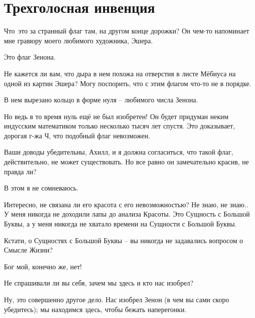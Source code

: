\documentclass[../main.tex]{subfiles}
\begin{document}
\section{Трехголосная инвенция}


\begin{Dialogue}

 Что~это за странный флаг там, на другом конце дорожки? Он чем-то напоминает мне гравюру моего любимого художника, Эшера.

 Это флаг Зенона.

 Не кажется ли вам, что дыра в нем похожа на отверстия в листе Мёбиуса на одной из картин Эшера? Могу поспорить, что с этим флагом что-то не в порядке.

 В нем вырезано кольцо в форме нуля \--- любимого числа Зенона.

 Но ведь в то время нуль ещё не был изобретен! Он будет придуман неким индусским математиком только несколько тысяч лет спустя. Это доказывает, дорогая г-жа Ч, что подобный флаг невозможен.

 Ваши доводы убедительны, Ахилл, и я должна согласиться, что такой флаг, действительно, не может существовать. Но все равно он замечательно красив, не правда ли?

 В этом я не сомневаюсь.

 Интересно, не связана ли его красота с его невозможностью? Не знаю, не знаю.. У меня никогда не доходили лапы до анализа Красоты. Это Сущность с Большой Буквы, а у меня никогда не хватало времени на Сущности с Большой Буквы.

 Кстати, о Сущностях с Большой Буквы \--- вы никогда не задавались вопросом о Смысле Жизни?

 Бог мой, конечно же, нет!

 Не спрашивали ли вы себя, зачем мы здесь и кто нас изобрел?

 Ну, это совершенно другое дело. Нас изобрел Зенон (в чем вы сами скоро убедитесь); мы находимся здесь, чтобы бежать наперегонки.


\end{Dialogue}
\end{document}
